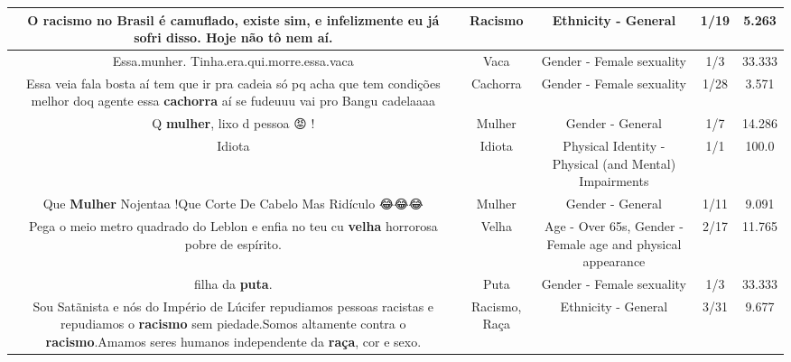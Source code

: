 \documentclass[11pt]{article}
\newlength\mylength
\begin{document}
\begin{center}
\begin{longtable}{|C{.65\mylength}|C{.30\mylength}|C{.12\mylength}|C{.12\mylength}|C{.12\mylength}|}
  \small O \textbf{racismo} no Brasil é camuflado, existe sim, e infelizmente eu já sofri disso. Hoje não tô nem aí.\normalsize   & Racismo & Ethnicity - General & 1/19 & 5.263 \\  \hline
  \small Essa.munher. Tinha.era.qui.morre.essa.vaca\normalsize   & Vaca & Gender - Female sexuality & 1/3 & 33.333 \\  \hline
  \small Essa veia fala bosta aí tem que ir pra cadeia só pq acha que tem condições melhor doq agente essa \textbf{cachorra} aí se fudeuuu vai pro Bangu cadelaaaa\normalsize   & Cachorra & Gender - Female sexuality & 1/28 & 3.571 \\  \hline
  \small Q \textbf{mulher}, lixo d pessoa 😡 !\normalsize   & Mulher & Gender - General & 1/7 & 14.286 \\  \hline
  \small Idiota\normalsize   & Idiota & Physical Identity - Physical (and Mental) Impairments & 1/1 & 100.0 \\  \hline
  \small Que \textbf{Mulher} Nojentaa !Que Corte De Cabelo Mas Ridículo 😂😂😂\normalsize   & Mulher & Gender - General & 1/11 & 9.091 \\  \hline
  \small Pega o meio metro quadrado do Leblon e enfia no teu cu \textbf{v\textbf{elha}} horrorosa pobre de espírito.\normalsize   & Velha & Age - Over 65s, Gender - Female age and physical appearance & 2/17 & 11.765 \\  \hline
  \small filha da \textbf{puta}.\normalsize   & Puta & Gender - Female sexuality & 1/3 & 33.333 \\  \hline
  \small Sou Satãnista e nós do Império de Lúcifer repudiamos pessoas racistas e repudiamos o \textbf{racismo} sem piedade.Somos altamente contra o \textbf{racismo}.Amamos seres humanos independente da \textbf{raça}, cor e sexo.\normalsize   & Racismo, Raça & Ethnicity - General & 3/31 & 9.677 \\  \hline

\end{longtable}
\end{center}
\end{document}
